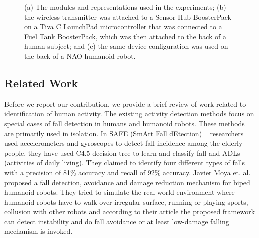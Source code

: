 \documentclass[letterpaper]{article}
\begin{document}
\begin{sloppy}
\begin{figure}[!t]
\centering
{}
\caption{(a) The modules and representations used in the experiments;  (b) the wireless transmitter 
was attached to a Sensor Hub BoosterPack on a Tiva C LaunchPad microcontroller that was connected to 
a Fuel Tank BoosterPack, which was then attached to the back of a human subject; and (c) the same 
device configuration was used on the back of a NAO humanoid robot.}
 \label{fig:framework}
\end{figure}


\subsection{Related Work}

Before we report our contribution, we provide a brief review of work related to identification of 
human activity. 
The existing activity detection methods focus on special cases of fall detection in humans and 
humanoid robots. These methods are primarily used in isolation.  
In SAFE (SmArt Fall dEtection) {~\cite{ojetola2011fall}} researchers used accelerometers and 
gyroscopes 
to detect fall incidence among the elderly people, they have used C4.5 decision tree to learn and 
classify fall and ADLs (activities of daily living). They claimed to identify four different types 
of falls with a precision of 81\% accuracy and recall of 92\% accuracy.
Javier Moya et. al.{~\cite{moya2014fall}} proposed a fall detection, avoidance and damage reduction 
mechanism for biped humanoid robots. They tried to simulate the real world environment where 
humanoid robots have to walk over irregular surface, running or playing sports, collusion with 
other 
robots and according to their article the proposed framework can detect instability and do fall 
avoidance or at least low-damage falling mechanism is invoked. 


\end{sloppy}
\end{document}
